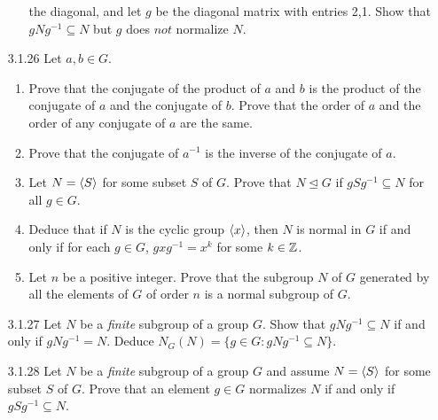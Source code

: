 \begin{enumerate}
\begin{enumerate}
                           the diagonal, and let $g$ be the diagonal matrix with
                           entries 2,1. Show that $gNg^{-1} \subseteq N$ but $g$
                           does $\textit{not}$ normalize $N$.
                  \end{enumerate}
   \item[3.1.26]  Let $a, b \in G$.
                  \begin{enumerate}
                     \item Prove that the conjugate of the product of $a$ and
                           $b$ is the product of the conjugate of $a$ and the
                           conjugate of $b$. Prove that the order of $a$ and the
                           order of any conjugate of $a$ are the same.
                     \item Prove that the conjugate of $a^{-1}$ is the inverse
                           of the conjugate of $a$.
                     \item Let $N = \langle S \rangle$ for some subset $S$ of $G$. Prove
                           that $N \trianglelefteq G$ if $gSg^{-1} \subseteq N$
                           for all $g \in G$.
                     \item Deduce that if $N$ is the cyclic group $\langle x \rangle$,
                           then $N$ is normal in $G$ if and only if for each
                           $g \in G$, $gxg^{-1} = x^k$ for some $k \in \mathbb{Z}$.
                     \item Let $n$ be a positive integer. Prove that the
                           subgroup $N$ of $G$ generated by all the elements of
                           $G$ of order $n$ is a normal subgroup of $G$.
                  \end{enumerate}
   \item[3.1.27]  Let $N$ be a \textit{finite} subgroup of a group $G$. Show
                  that $gNg^{-1} \subseteq N$ if and only if $gNg^{-1} = N$.
                  Deduce $N_G(N) = \{g \in G : gNg^{-1} \subseteq N\}$.
   \item[3.1.28]  Let $N$ be a \textit{finite} subgroup of a group $G$ and
                  assume $N = \langle S \rangle$ for some subset $S$ of $G$. Prove that an
                  element $g \in G$ normalizes $N$ if and only if
                  $gSg^{-1} \subseteq N$.

\end{enumerate}
